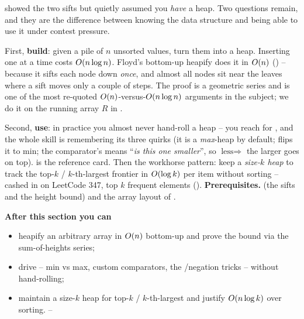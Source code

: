 \begin{topicintro}
 showed the two sifts but quietly assumed you \emph{have} a heap. Two questions remain,
and they are the difference between knowing the data structure and being able to use it under contest
pressure.

First, \textbf{build}: given a pile of $n$ unsorted values, turn them into a heap. Inserting one at a time
costs $O(n\log n)$. Floyd's bottom-up heapify does it in $O(n)$ () -- because it
sifts each node down \emph{once}, and almost all nodes sit near the leaves where a sift moves only a
couple of steps. The proof is a geometric series and is one of the most re-quoted $O(n)$-versus-$%
\bigO{n\log n}$ arguments in the subject; we do it on the running array $R$ in .

Second, \textbf{use}: in practice you almost never hand-roll a heap -- you reach for
, and the whole skill is remembering its three quirks (it is a \emph{max}-heap
by default;  flips it to min; the comparator's  means ``\emph{is this one
smaller}'', so $\text{less} \Rightarrow$ the larger goes on top).  is the reference card.
Then the workhorse pattern: keep a \emph{size-$k$ heap} to track the top-$k$ / $k$-th-largest frontier in
$O(\log k)$ per item without sorting -- cashed in on LeetCode 347, top $k$ frequent elements
().
\textbf{Prerequisites.}  (the sifts and the height bound) and the array layout of
.

\textbf{After this section you can}
\begin{itemize}[nosep]
  \item heapify an arbitrary array in $O(n)$ bottom-up and prove the bound via the sum-of-heights
        series; \hfill{}
  \item drive  -- min vs max, custom comparators, the /negation
        tricks -- without hand-rolling; \hfill{}
  \item maintain a size-$k$ heap for top-$k$ / $k$-th-largest and justify $O(n\log k)$ over sorting. \hfill{}--
\end{itemize}
\end{topicintro}

